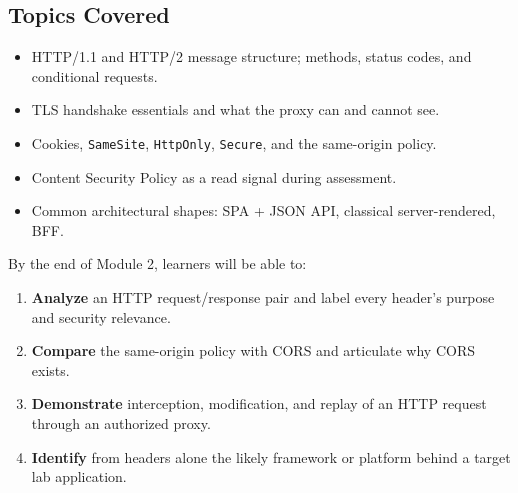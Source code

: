 \documentclass[11pt,letterpaper,oneside]{report}
\newcommand{\tool}[1]{\texttt{\small #1}}
\begin{document}
\subsection*{Topics Covered}
\begin{itemize}
  \item HTTP/1.1 and HTTP/2 message structure; methods, status codes, and conditional requests.
  \item TLS handshake essentials and what the proxy can and cannot see.
  \item Cookies, \tool{SameSite}, \tool{HttpOnly}, \tool{Secure}, and the same-origin policy.
  \item Content Security Policy as a read signal during assessment.
  \item Common architectural shapes: SPA + JSON API, classical server-rendered, BFF.
\end{itemize}

\begin{outcomes}
By the end of Module 2, learners will be able to:
\begin{enumerate}
  \item \textbf{Analyze} an HTTP request/response pair and label every header's purpose and security relevance.
  \item \textbf{Compare} the same-origin policy with CORS and articulate why CORS exists.
  \item \textbf{Demonstrate} interception, modification, and replay of an HTTP request through an authorized proxy.
  \item \textbf{Identify} from headers alone the likely framework or platform behind a target lab application.
\end{enumerate}
\end{outcomes}
\end{document}
